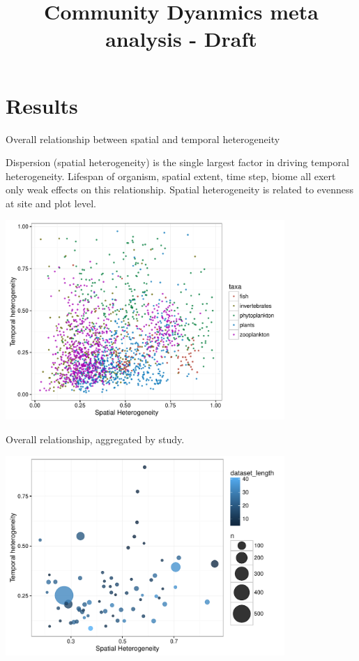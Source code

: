 \documentclass[11pt]{article}
\title{Community Dyanmics meta analysis - Draft}
\begin{document}
\maketitle





\section{Results}


Overall relationship between spatial and temporal heterogeneity

Dispersion (spatial heterogeneity) is the single largest factor in driving temporal heterogeneity. Lifespan of organism, spatial extent, time step, biome all exert only weak effects on this relationship. Spatial heterogeneity is related to evenness at site and plot level. 

\includegraphics[width=400px]{overall}


\newpage
Overall relationship, aggregated by study.

\includegraphics[width=400px]{overallagg}
\end{document}
